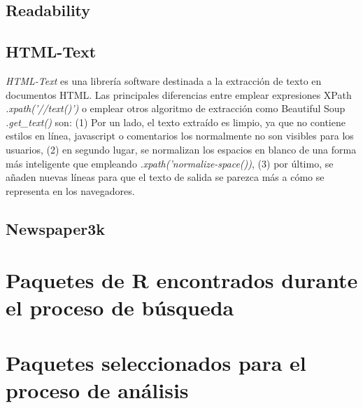 \subsection{Readability}
\label{subsec:readability}

\subsection{HTML-Text}
\label{subsec:html-text}

\emph{HTML-Text} \cite{html-text} es una librería software destinada a la extracción de texto en documentos
HTML. Las principales diferencias entre emplear expresiones XPath \emph{.xpath('//text()')} o emplear
otros algoritmo de extracción como Beautiful Soup \emph{.get\_text()} son: (1) Por un lado, el texto extraído
es limpio, ya que no contiene estilos en línea, javascript o comentarios los normalmente no son visibles 
para los usuarios, (2) en segundo lugar, se normalizan los espacios en blanco de una forma más inteligente 
que empleando \emph{.xpath('normalize-space())}, (3) por último, se añaden nuevas líneas para que el texto 
de salida se parezca más a cómo se representa en los navegadores. 

\subsection{Newspaper3k}
\label{subsec:news-paper}

\section{Paquetes de R encontrados durante el proceso de búsqueda}
\label{sec:paquetes de r encontrados durante el proceso de busqueda}

\section{Paquetes seleccionados para el proceso de análisis}
\label{sec:paquetes seleccionados para el proceso de analisis}
